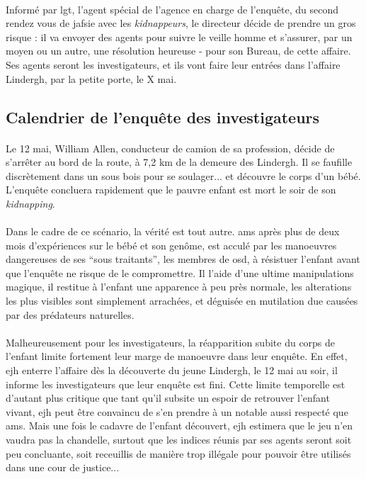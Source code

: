 \paragraph{} Informé par \gls{lgt}, l'agent spécial de l'agence en charge de l'enquête, du second rendez vous de \gls{jafsie} avec les \emph{kidnappeurs},
le directeur décide de prendre un gros risque : il va envoyer des agents pour suivre le veille homme et s'assurer, par un moyen ou un autre, une résolution
heureuse - pour son Bureau, de cette affaire. Ses agents seront les investigateurs, et ils vont faire leur entrées dans l'affaire Lindergh, par la petite porte, le X mai.

\subsection{Calendrier de l'enquête des investigateurs}
\paragraph{} Le 12 mai, William Allen, conducteur de camion de sa profession, décide de s'arrêter au bord de la route, à 7,2 km de la demeure des Lindergh. Il
se faufille discrètement dans un sous bois pour se soulager... et découvre le corps d'un bébé. L'enquête concluera rapidement que le pauvre enfant est mort le
soir de son \emph{kidnapping}. 
\paragraph{} Dans le cadre de ce scénario, la vérité est tout autre. \gls{ams} après plus de deux mois d'expériences sur le bébé et son genôme, est acculé par les manoeuvres dangereuses de ses ``sous traitants'', les membres de \gls{osd}, à résistuer l'enfant avant que l'enquête ne risque de le compromettre. Il 
l'aide d'une ultime manipulations magique, il restitue à l'enfant une apparence à peu près normale, les alterations les plus visibles sont simplement arrachées,
et déguisée en mutilation due causées par des prédateurs naturelles.
\paragraph{} Malheureusement pour les investigateurs, la réapparition subite du corps de l'enfant limite fortement leur marge de manoeuvre dans leur enquête. En effet, \gls{ejh} enterre l'affaire dès la découverte du jeune Lindergh, le 12 mai au soir, il informe les investigateurs que leur enquête est fini. Cette limite temporelle est d'autant plus critique que tant qu'il subsite un espoir de retrouver l'enfant vivant, \gls{ejh} peut être convaincu de s'en prendre à un 
notable aussi respecté que \gls{ams}. Mais une fois le cadavre de l'enfant découvert, \gls{ejh} estimera que le jeu n'en vaudra pas la chandelle, surtout que
les indices réunis par ses agents seront soit peu concluante, soit receuillis de manière trop illégale pour pouvoir être utilisés dans une cour de justice...

